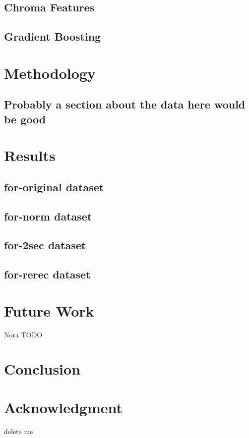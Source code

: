 \documentclass[conference]{IEEEtran}
\begin{document}
\subsection{Chroma Features}

\subsection{Gradient Boosting}

\section{Methodology}

\subsection{Probably a section about the data here would be good}

\section{Results}

\subsection{for-original dataset}

\subsection{for-norm dataset}

\subsection{for-2sec dataset}

\subsection{for-rerec dataset}

\section{Future Work}
Nora TODO
\section{Conclusion}

\section*{Acknowledgment}



\vspace{12pt}
\color{red}
delete me
\end{document}
